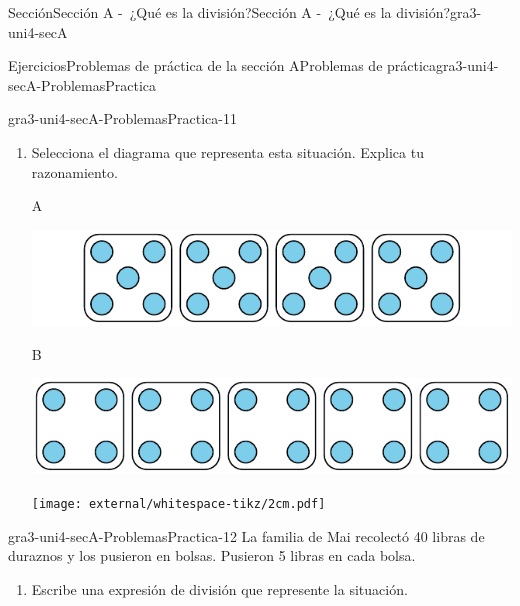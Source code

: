 \begin{sectionptx}{Sección}{Sección A -~¿Qué es la división?}{}{Sección A -~¿Qué es la división?}{}{}{gra3-uni4-secA}
\begin{exercises-subsection}{Ejercicios}{Problemas de práctica de la sección A}{}{Problemas de práctica}{}{}{gra3-uni4-secA-ProblemasPractica}
\begin{divisionexercise}{9}{}{}{gra3-uni4-secA-ProblemasPractica-11}
\begin{enumerate}[label={(\alph*)}]
\begin{image}{0}{1}{0}{}%
\texttt{[image: external/whitespace-tikz/1cm.pdf]}
\end{image}%
\item{}Selecciona el diagrama que representa esta situación. Explica tu razonamiento.%
\begin{sidebyside}{2}{0}{0}{0}%
\begin{sbspanel}{0.07}%
A%
\end{sbspanel}%
\begin{sbspanel}{0.93}%
\includegraphics[max width=\linewidth, center]{external/svg-source/tikz-file-151671.pdf}
\end{sbspanel}%
\end{sidebyside}%
\begin{sidebyside}{2}{0}{0}{0}%
\begin{sbspanel}{0.07}%
B%
\end{sbspanel}%
\begin{sbspanel}{0.93}%
\includegraphics[max width=\linewidth, center]{external/svg-source/tikz-file-151672.pdf}
\end{sbspanel}%
\end{sidebyside}%
\begin{image}{0}{1}{0}{}%
\texttt{[image: external/whitespace-tikz/2cm.pdf]}
\end{image}%
\end{enumerate}
%
\end{divisionexercise}%
\begin{divisionexercise}{10}{}{}{gra3-uni4-secA-ProblemasPractica-12}%
La familia de Mai recolectó 40 libras de duraznos y los pusieron en bolsas. Pusieron 5 libras en cada bolsa.%
\par
%
\begin{enumerate}[label={(\alph*)}]
\item{}Escribe una expresión de división que represente la situación.%
\begin{image}{0}{1}{0}{}%

\end{image}
\end{enumerate}
\end{divisionexercise}
\end{exercises-subsection}
\end{sectionptx}

